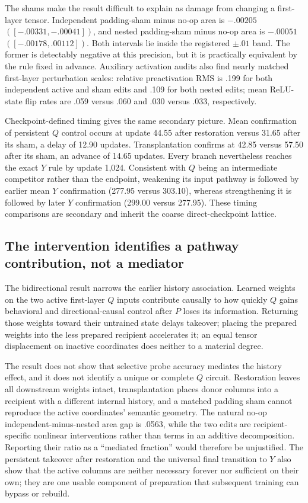 The shams make the result difficult to explain as damage from changing a first-layer tensor. Independent padding-sham minus no-op area is $-.00205$ $([-.00331,-.00041])$, and nested padding-sham minus no-op area is $-.00051$ $([-.00178,.00112])$. Both intervals lie inside the registered $\pm.01$ band. The former is detectably negative at this precision, but it is practically equivalent by the rule fixed in advance. Auxiliary activation audits also find nearly matched first-layer perturbation scales: relative preactivation RMS is .199 for both independent active and sham edits and .109 for both nested edits; mean ReLU-state flip rates are .059 versus .060 and .030 versus .033, respectively.

Checkpoint-defined timing gives the same secondary picture. Mean confirmation of persistent $Q$ control occurs at update 44.55 after restoration versus 31.65 after its sham, a delay of 12.90 updates. Transplantation confirms at 42.85 versus 57.50 after its sham, an advance of 14.65 updates. Every branch nevertheless reaches the exact $Y$ rule by update 1,024. Consistent with $Q$ being an intermediate competitor rather than the endpoint, weakening its input pathway is followed by earlier mean $Y$ confirmation (277.95 versus 303.10), whereas strengthening it is followed by later $Y$ confirmation (299.00 versus 277.95). These timing comparisons are secondary and inherit the coarse direct-checkpoint lattice.

\subsection*{The intervention identifies a pathway contribution, not a mediator}

The bidirectional result narrows the earlier history association. Learned weights on the two active first-layer $Q$ inputs contribute causally to how quickly $Q$ gains behavioral and directional-causal control after $P$ loses its information. Returning those weights toward their untrained state delays takeover; placing the prepared weights into the less prepared recipient accelerates it; an equal tensor displacement on inactive coordinates does neither to a material degree.

The result does not show that selective probe accuracy mediates the history effect, and it does not identify a unique or complete $Q$ circuit. Restoration leaves all downstream weights intact, transplantation places donor columns into a recipient with a different internal history, and a matched padding sham cannot reproduce the active coordinates' semantic geometry. The natural no-op independent-minus-nested area gap is .0563, while the two edits are recipient-specific nonlinear interventions rather than terms in an additive decomposition. Reporting their ratio as a ``mediated fraction'' would therefore be unjustified. The persistent takeover after restoration and the universal final transition to $Y$ also show that the active columns are neither necessary forever nor sufficient on their own; they are one usable component of preparation that subsequent training can bypass or rebuild.

